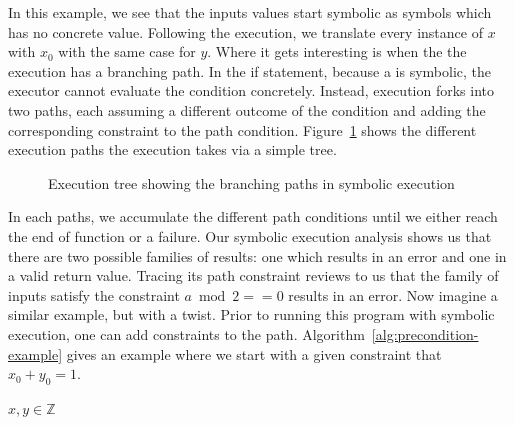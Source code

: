 \documentclass[11pt]{article}
\begin{document}
In this example, we see that the inputs values start symbolic as symbols which has no concrete value. Following the execution, we translate every instance of $x$ with $x_0$ with the same case for $y$. Where it gets interesting is when the the execution has a branching path. In the if statement, because a is symbolic, the executor cannot evaluate the condition concretely. Instead, execution forks into two paths, each assuming a different outcome of the condition and adding the corresponding constraint to the path condition. Figure~\ref{fig:execution-tree} shows the different execution paths the execution takes via a simple tree.

\begin{figure}[H]
    \centering
    \caption{Execution tree showing the branching paths in symbolic execution}
    \label{fig:execution-tree}
\end{figure}

In each paths, we accumulate the different path conditions until we either reach the end of function or a failure. Our symbolic execution analysis shows us that there are two possible families of results: one which results in an error and one in a valid return value. Tracing its path constraint reviews to us that the family of inputs satisfy the constraint $a\bmod 2 == 0$ results in an error. Now imagine a similar example, but with a twist. Prior to running this program with symbolic execution, one can add constraints to the path. Algorithm~\ref{alg:precondition-example} gives an example where we start with a given constraint that $x_0+y_0=1$.

\begin{algorithm}
    \caption{Algorithm 1 called with a precondition}
    \label{alg:precondition-example}
    \begin{algorithmic}[1]
    \Require $x, y \in \mathbb{Z}$
        \State {}
    \EndIf
    \end{algorithmic}
\end{algorithm}
\end{document}
